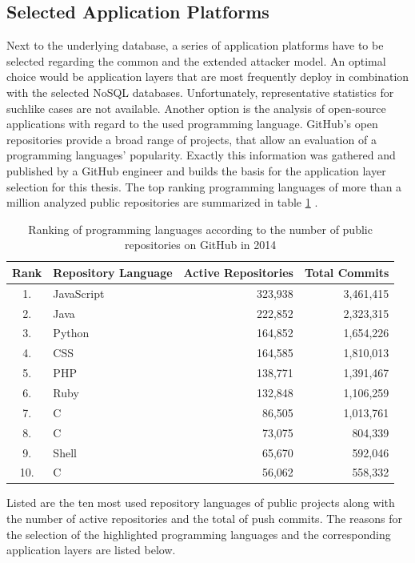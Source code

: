 \subsection{Selected Application Platforms}
Next to the underlying database, a series of application platforms have to be selected regarding the common and the extended attacker model. An optimal choice would be application layers that are most frequently deploy in combination with the selected NoSQL databases. Unfortunately, representative statistics for suchlike cases are not available. Another option is the analysis of open-source applications with regard to the used programming language. GitHub's open repositories provide a broad range of projects, that allow an evaluation of a programming languages' popularity. Exactly this information was gathered and published by a GitHub engineer and builds the basis for the application layer selection for this thesis. The top ranking programming languages of more than a million analyzed public repositories are summarized in table \ref{tab:language_ranking} \cite{Zapponi2014}.

\begin{table}[h] 
 \centering
 \begin{tabular}{clrr}
  \textbf{Rank} & \textbf{Repository Language} & \textbf{Active Repositories} & \textbf{Total Commits} \\ \hline
  \rowcolor{light-gray} 1. &  JavaScript     & 323,938 & 3,461,415 \\
  2. &  Java   & 222,852 & 2,323,315 \\
  \rowcolor{light-gray} 3. &  Python  & 164,852 & 1,654,226 \\
  4. &  CSS       & 164,585 & 1,810,013 \\
  \rowcolor{light-gray}5. &  PHP      & 138,771 & 1,391,467 \\
  \rowcolor{light-gray}6. &  Ruby  & 132,848 & 1,106,259 \\
   7. &  C\scriptsize\raisebox{.5ex}{++} & 86,505 & 1,013,761 \\
  8. &  C & 73,075 & 804,339 \\
  9. &  Shell   & 65,670 & 592,046 \\
  10. &  C\scriptsize\raisebox{.5ex}{\#} & 56,062 & 558,332 \\
  \bottomrule
 \end{tabular}
 \caption{Ranking of programming languages according to the number of public repositories on GitHub in 2014}
 \label{tab:language_ranking}
\end{table}
Listed are the ten most used repository languages of public projects along with the number of active repositories and the total of push commits. The reasons for the selection of the highlighted programming languages and the corresponding application layers are listed below.

